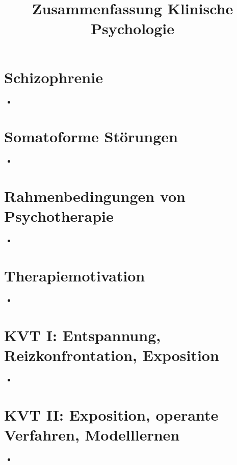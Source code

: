 \documentclass[11pt, paper=a4, twocolumn]{scrartcl}
\title{\vspace{-1.25cm}Zusammenfassung Klinische Psychologie\vspace{-0.25cm}}
\date{\vspace{-5ex}}
\begin{document}
	\maketitle


	\section{Schizophrenie}
		\begin{itemize}
			\item 
		\end{itemize}

	\section{Somatoforme Störungen}
		\begin{itemize}
			\item 
		\end{itemize}

	\section{Rahmenbedingungen von Psychotherapie}
		\begin{itemize}
			\item 
		\end{itemize}

	\section{Therapiemotivation}
		\begin{itemize}
			\item 
		\end{itemize}

	\section{KVT I: Entspannung, Reizkonfrontation, Exposition}
		\begin{itemize}
			\item 
		\end{itemize}

	\section{KVT II: Exposition, operante Verfahren, Modelllernen}
		\begin{itemize}
			\item 
		\end{itemize}
\end{document}

